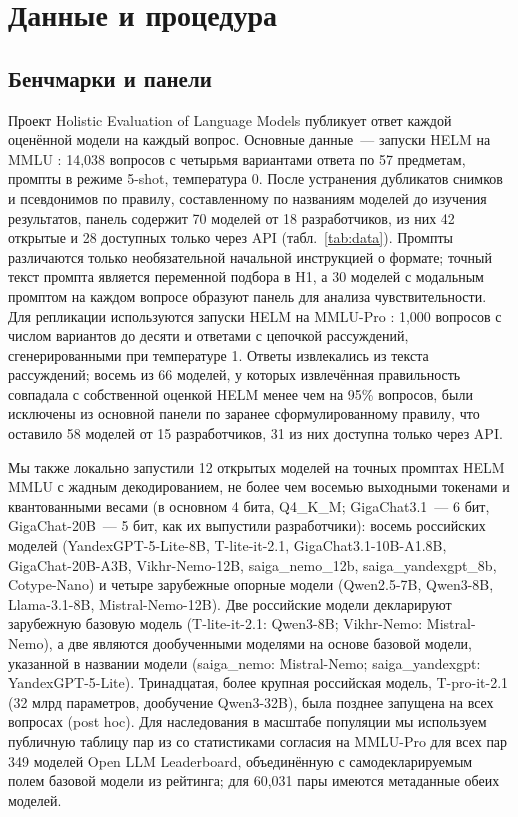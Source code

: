 \documentclass[preprint,12pt,authoryear]{elsarticle}
\begin{document}
\section{Данные и процедура}

\subsection{Бенчмарки и панели}
Проект Holistic Evaluation of Language Models \citep{liang2023helm} публикует ответ каждой оценённой модели на каждый вопрос. Основные данные~--- запуски HELM на MMLU \citep{hendrycks2021mmlu}: 14,038 вопросов с четырьмя вариантами ответа по 57 предметам, промпты в режиме 5-shot, температура 0. После устранения дубликатов снимков и псевдонимов по правилу, составленному по названиям моделей до изучения результатов, панель содержит 70 моделей от 18 разработчиков, из них 42 открытые и 28 доступных только через API (табл.~\ref{tab:data}). Промпты различаются только необязательной начальной инструкцией о формате; точный текст промпта является переменной подбора в H1, а 30 моделей с модальным промптом на каждом вопросе образуют панель для анализа чувствительности. Для репликации используются запуски HELM на MMLU-Pro \citep{wang2024mmlupro}: 1,000 вопросов с числом вариантов до десяти и ответами с цепочкой рассуждений, сгенерированными при температуре 1. Ответы извлекались из текста рассуждений; восемь из 66 моделей, у которых извлечённая правильность совпадала с собственной оценкой HELM менее чем на 95\% вопросов, были исключены из основной панели по заранее сформулированному правилу, что оставило 58 моделей от 15 разработчиков, 31 из них доступна только через API.

Мы также локально запустили 12 открытых моделей на точных промптах HELM MMLU с жадным декодированием, не более чем восемью выходными токенами и квантованными весами (в основном 4 бита, Q4\_K\_M; GigaChat3.1~--- 6 бит, GigaChat-20B~--- 5 бит, как их выпустили разработчики): восемь российских моделей (YandexGPT-5-Lite-8B, T-lite-it-2.1, GigaChat3.1-10B-A1.8B, GigaChat-20B-A3B, Vikhr-Nemo-12B, saiga\_\allowbreak nemo\_\allowbreak 12b, saiga\_\allowbreak yandexgpt\_\allowbreak 8b, Cotype-Nano) и четыре зарубежные опорные модели (Qwen2.5-7B, Qwen3-8B, Llama-3.1-8B, Mistral-Nemo-12B). Две российские модели декларируют зарубежную базовую модель (T-lite-it-2.1: Qwen3-8B; Vikhr-Nemo: Mistral-Nemo), а две являются дообученными моделями на основе базовой модели, указанной в названии модели (saiga\_nemo: Mistral-Nemo; saiga\_yandexgpt: YandexGPT-5-Lite). Тринадцатая, более крупная российская модель, T-pro-it-2.1 (32 млрд параметров, дообучение Qwen3-32B), была позднее запущена на всех вопросах (post hoc). Для наследования в масштабе популяции мы используем публичную таблицу пар из \citet{kim2025correlated} со статистиками согласия на MMLU-Pro для всех пар 349 моделей Open LLM Leaderboard, объединённую с самодекларируемым полем базовой модели из рейтинга; для 60,031 пары имеются метаданные обеих моделей.
\end{document}

